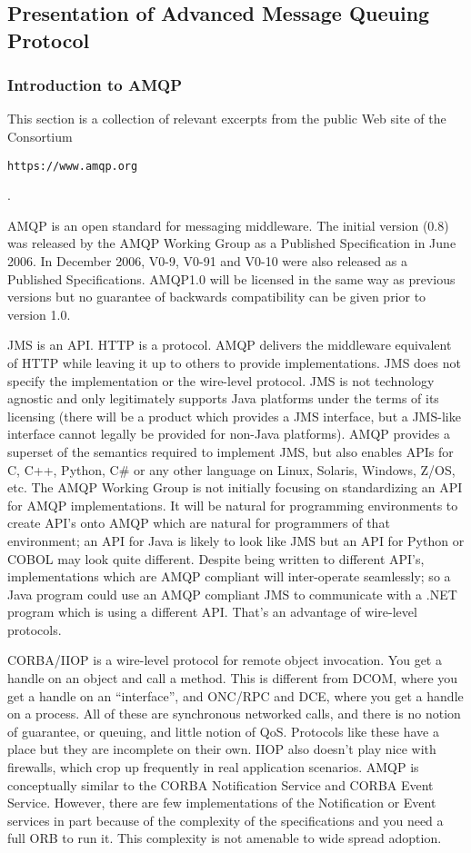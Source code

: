 \subsection{Presentation of Advanced Message Queuing Protocol}
\label{SS_presentation_amqp}

\subsubsection{Introduction to AMQP}

This section is a collection of relevant excerpts from the public Web
site of the
Consortium \begin{small}\texttt{https://www.amqp.org}\end{small}.

AMQP is an open standard for messaging middleware. The initial version
(0.8) was released by the AMQP Working Group as a Published
Specification in June 2006. In December 2006, V0-9, V0-91 and V0-10
were also released as a Published Specifications. AMQP1.0 will be
licensed in the same way as previous versions but no guarantee of
backwards compatibility can be given prior to version 1.0.

JMS is an API. HTTP is a protocol. AMQP delivers the middleware
equivalent of HTTP while leaving it up to others to provide
implementations. JMS does not specify the implementation or the
wire-level protocol. JMS is not technology agnostic and only
legitimately supports Java platforms under the terms of its licensing
(there will be a product which provides a JMS interface, but a
JMS-like interface cannot legally be provided for non-Java platforms).
AMQP provides a superset of the semantics required to implement JMS,
but also enables APIs for C, C++, Python, C\# or any other language on
Linux, Solaris, Windows, Z/OS, etc. The AMQP Working Group is not
initially focusing on standardizing an API for AMQP implementations.
It will be natural for programming environments to create API's onto
AMQP which are natural for programmers of that environment; an API for
Java is likely to look like JMS but an API for Python or COBOL may
look quite different. Despite being written to different API's,
implementations which are AMQP compliant will inter-operate
seamlessly; so a Java program could use an AMQP compliant JMS to
communicate with a .NET program which is using a different API. That's
an advantage of wire-level protocols.

CORBA/IIOP is a wire-level protocol for remote object invocation. You
get a handle on an object and call a method. This is different from
DCOM, where you get a handle on an ``interface'', and ONC/RPC and DCE,
where you get a handle on a process. All of these are synchronous
networked calls, and there is no notion of guarantee, or queuing, and
little notion of QoS. Protocols like these have a place but they are
incomplete on their own. IIOP also doesn't play nice with firewalls,
which crop up frequently in real application scenarios.  AMQP is
conceptually similar to the CORBA Notification Service and CORBA Event
Service. However, there are few implementations of the Notification or
Event services in part because of the complexity of the specifications
and you need a full ORB to run it. This complexity is not amenable to
wide spread adoption.

